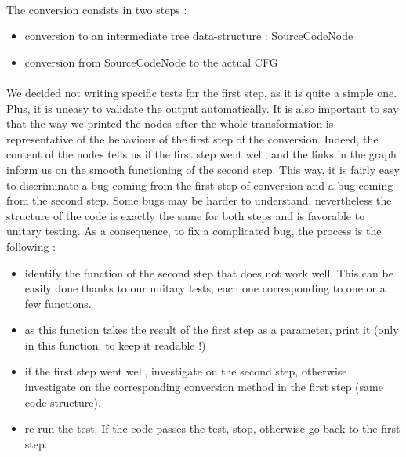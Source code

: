 \documentclass{report}
\begin{document}
\paragraph{}
\hspace{4mm}The conversion consists in two steps :

\vspace{1.5mm}
\begin{itemize}
\item conversion to an intermediate tree data-structure : SourceCodeNode\vspace{1mm}
\item conversion from SourceCodeNode to the actual CFG\vspace{1mm}
\end{itemize}

\paragraph{}
\hspace{4mm}We decided not writing specific tests for the first step, as it is quite a simple one. Plus, it is uneasy to
validate the output automatically.  It is also important to say that
the way we printed the nodes after the whole transformation is representative of the behaviour of the first step of the conversion. Indeed, the content of the nodes
tells us if the first step went well, and the links in the graph inform us on the smooth functioning of the second step.
This way, it is fairly easy to discriminate a bug coming from the first step of conversion and a bug coming from the second step. Some bugs may
be harder to understand, nevertheless the structure of the code is exactly the same for both steps and is favorable to unitary testing.
As a consequence, to fix a complicated bug, the process is the following :

\vspace{1.5mm}
\begin{itemize}
\item identify the function of the second step that does not work well. This can be easily done thanks to our unitary tests, each one corresponding to one or a few functions.\vspace{1mm}
\item as this function takes the result of the first step as a parameter, print it (only in this function, to keep it readable !)\vspace{1mm}
\item if the first step went well, investigate on the second step, otherwise investigate on the corresponding conversion method in the first step (same code structure).\vspace{1mm}
\item re-run the test. If the code passes the test, stop, otherwise go back to the first step.\vspace{1mm}
\end{itemize}
\end{document}
